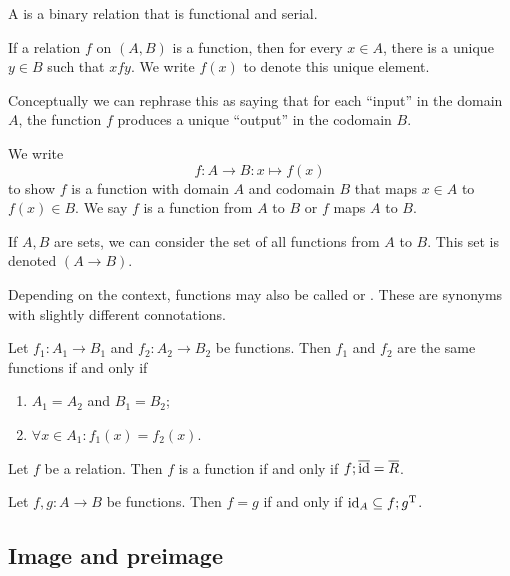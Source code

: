 \begin{definition}
A  is a binary relation that is functional and serial.
\end{definition}
If a relation $f$ on $(A, B)$ is a function, then for every $x\in A$, there is a unique $y\in B$ such that $xfy$. We write $f(x)$ to denote this unique element.

Conceptually we can rephrase this as saying that for each ``input'' in the domain $A$, the function $f$ produces a unique ``output'' in the codomain $B$.

\begin{note}
We write
\[f:A \to B: x\mapsto f(x) \]
to show $f$ is a function with domain $A$ and codomain $B$ that maps $x\in A$ to $f(x)\in B$. We say $f$ is a function from $A$ to $B$ or $f$ maps $A$ to $B$. 

If $A, B$ are sets, we can consider the  set of all functions from $A$ to $B$. This set is denoted $(A\to B)$.
\end{note}

Depending on the context, functions may also be called  or . These are synonyms with slightly different connotations.

\begin{lemma}
Let $f_1: A_1\to B_1$ and $f_2: A_2\to B_2$ be functions. Then $f_1$ and $f_2$ are the same functions \textup{if and only if}
\begin{enumerate}
\item $A_1 = A_2$ and $B_1 = B_2$;
\item $\forall x\in A_1: f_1(x) = f_2(x)$.
\end{enumerate}
\end{lemma}

\begin{lemma}
Let $f$ be a relation. Then $f$ is a function \textup{if and only if} $f;\overline{\operatorname{id}} = \overline{R}$.
\end{lemma}

\begin{lemma} \label{functionEqualityIdComparison}
Let $f,g: A\to B$ be functions. Then $f = g$ \textup{if and only if} $\operatorname{id}_A \subseteq f;g^{\mathrm{T}}$.
\end{lemma}

\subsection{Image and preimage}
